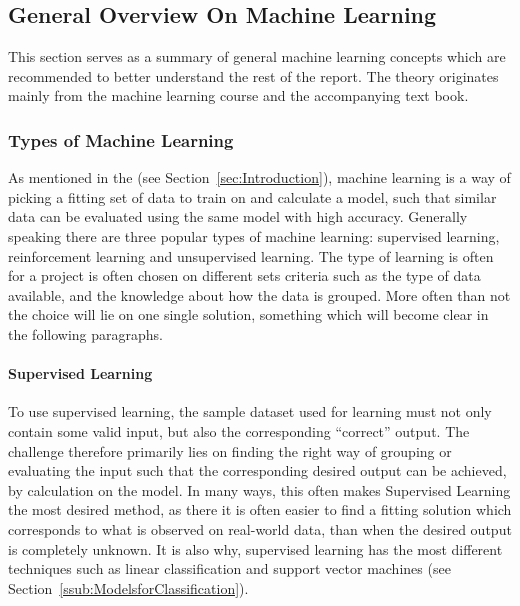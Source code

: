 \subsection{General Overview On Machine Learning}
\label{sub:GeneralML}
This section serves as a summary of general machine learning concepts
which are recommended to better understand the rest of the report.
The theory originates mainly from the machine learning course\cite{learningfromdata2012course} and the accompanying text book\cite{learningfromdata2012book}.

\subsubsection{Types of Machine Learning}
\label{ssub:TypesofMachineLearning}
As mentioned in the  (see Section~\ref{sec:Introduction}),
machine learning is a way of picking a fitting set of data to train on and calculate a model, 
such that similar data can be evaluated using the same model with high accuracy.
Generally speaking there are three popular types of machine learning:
supervised learning, reinforcement learning and unsupervised learning.
The type of learning is often for a project is often chosen on different sets criteria such as the type of data available,
and the knowledge about how the data is grouped.
More often than not the choice will lie on one single solution, something which will become clear in the following paragraphs.

\paragraph{Supervised Learning}
\label{par:SupervisedLearning}
To use supervised learning, the sample dataset used for learning must not only contain some valid input, but also the corresponding ``correct'' output.
The challenge therefore primarily lies on finding the right way of grouping or evaluating the input
such that the corresponding desired output can be achieved, by calculation on the model.
In many ways, this often makes Supervised Learning the most desired method, as there it is often easier to find a fitting solution which corresponds to what is observed on real-world data,
than when the desired output is completely unknown. It is also why, supervised learning has the most different techniques such as linear classification and support vector machines (see Section~\ref{ssub:ModelsforClassification}).

